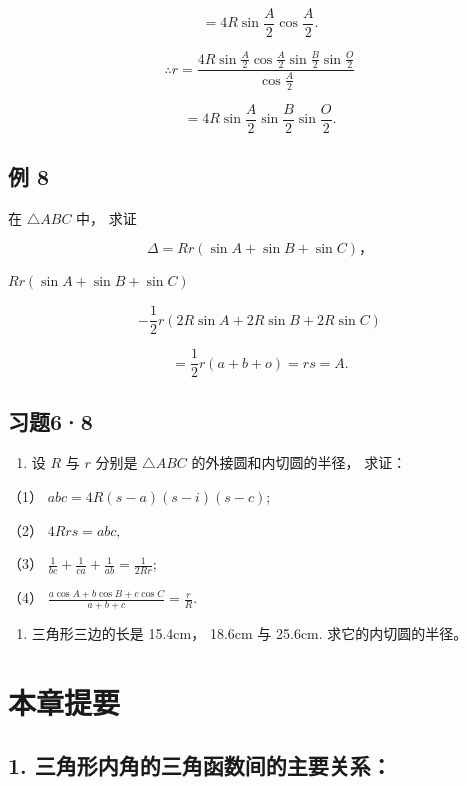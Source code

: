 \[
= 4 R \sin \frac {A}{2} \cos \frac {A}{2}.
\]

\[
\therefore r = \frac {4 R \sin \frac {A}{2} \cos \frac {A}{2} \sin \frac {B}{2} \sin \frac {O}{2}}{\cos \frac {A}{2}}
\]

\[
= 4 R \sin \frac {A}{2} \sin \frac {B}{2} \sin \frac {O}{2}.
\]

\subsection{例 8}

在 \(\triangle ABC\) 中， 求证

\[
\Delta = R r (\sin A + \sin B + \sin C)\text{，}
\]

 \(Rr(\sin A + \sin B + \sin C)\)

\[
- \frac {1}{2} r (2 R \sin A + 2 R \sin B + 2 R \sin C)
\]

\[
= \frac {1}{2} r (a + b + o) = r s = A.
\]

\subsection{习题6·8}

\begin{enumerate}
\item
  设 \(R\) 与 \(r\) 分别是 \(\triangle ABC\) 的外接圆和内切圆的半径，
  求证：
\end{enumerate}

（1） \(abc = 4R(s - a)(s - i)(s - c);\)

（2） \(4Rrs = abc,\)

（3） \(\frac{1}{bc} + \frac{1}{ca} + \frac{1}{ab} = \frac{1}{2Rr};\)

（4） \(\frac{a\cos A + b\cos B + c\cos C}{a + b + c} = \frac{r}{R}\).

\begin{enumerate}[start=2]
\item
  三角形三边的长是 15.4cm， 18.6cm 与 25.6cm. 求它的内切圆的半径。
\end{enumerate}

\section{本章提要}

\subsection{1. 三角形内角的三角函数间的主要关系：}

